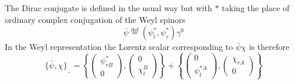 \documentclass[a4paper,a4paper]{article}
\begin{document}
The Dirac conjugate is defined in the usual way but with $\ast $ taking the
place of ordinary complex conjugation of the Weyl spinors 
\begin{equation} 
\bar{\psi } \stackrel{ \mathrm{def}}{=} (\psi _{l}^{\ast} ,\psi
_{r}^{\ast}) \gamma ^{0}
\label{c5}
\end{equation}
In the Weyl representation the Lorentz scalar corresponding to $\bar{\psi }\chi$
is therefore
\begin{equation} 
\{ \bar{\psi} ,\chi \}_{_{\sim }} = \left \{ \left( \begin{array}{c}
\psi_{rB}^{\ast } \\ 0 \end{array} \right),  \left( \begin{array}{c} 0\\
\chi_{l}^{B}  \end{array} \right) \right \} +  \left \{ \left( \begin{array}{c}
0\\\psi_{l}^{\ast \dot{A} }  \end{array} \right),
\left( \begin{array}{c} \chi_{r \dot{A}}\\0 \  \end{array} \right) \right \}
\label{c6}
\end{equation}
\end{document}
